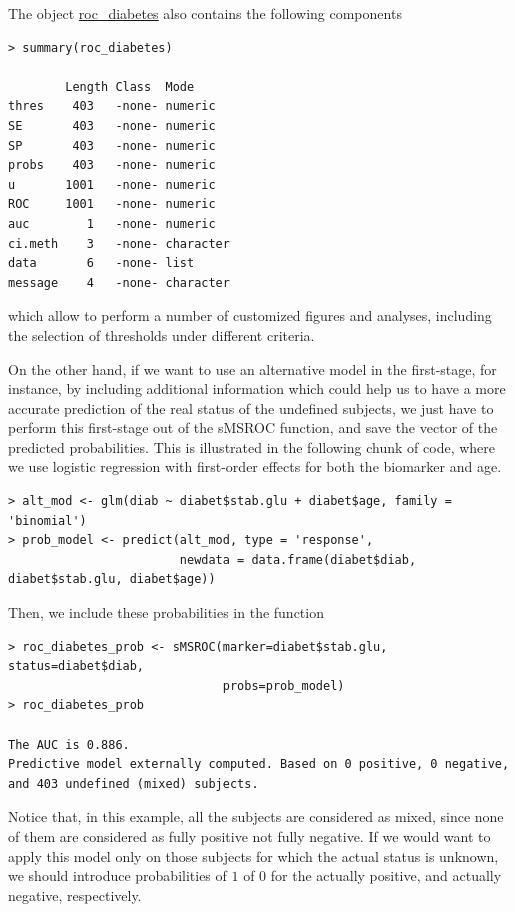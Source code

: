  The object \url{roc_diabetes} also contains the following components
\begin{verbatim}
> summary(roc_diabetes)

        Length Class  Mode     
thres    403   -none- numeric  
SE       403   -none- numeric  
SP       403   -none- numeric  
probs    403   -none- numeric  
u       1001   -none- numeric  
ROC     1001   -none- numeric  
auc        1   -none- numeric  
ci.meth    3   -none- character
data       6   -none- list     
message    4   -none- character
\end{verbatim}
which allow to perform a number of customized figures and analyses, including the selection of thresholds under different criteria.

On the other hand, if we want to use an alternative model in the first-stage, for instance, by including additional information which could help us to have a more accurate prediction of the real status of the undefined subjects, we just have to perform this first-stage out of the sMSROC function, and save the vector of the predicted probabilities. This is illustrated in the following chunk of code, where we use logistic regression with first-order effects for both the biomarker and age.
\begin{verbatim}
> alt_mod <- glm(diab ~ diabet$stab.glu + diabet$age, family = 'binomial')
> prob_model <- predict(alt_mod, type = 'response',
                        newdata = data.frame(diabet$diab, diabet$stab.glu, diabet$age))
\end{verbatim}
Then, we include these probabilities in the function
\begin{verbatim}
> roc_diabetes_prob <- sMSROC(marker=diabet$stab.glu, status=diabet$diab, 
                              probs=prob_model)
> roc_diabetes_prob

The AUC is 0.886.
Predictive model externally computed. Based on 0 positive, 0 negative, 
and 403 undefined (mixed) subjects.
\end{verbatim}

Notice that, in this example, all the subjects are considered as mixed, since none of them are considered as fully positive not fully negative. If we would want to apply this model only on those subjects for which the actual status is unknown, we should introduce probabilities of $1$ of $0$ for the actually positive, and actually negative, respectively.


